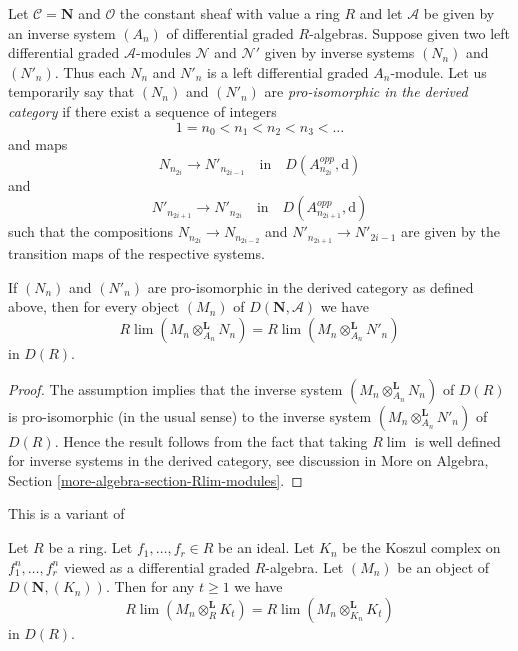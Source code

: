 \noindent
Let $\mathcal{C} = \mathbf{N}$ and $\mathcal{O}$ the constant sheaf
with value a ring $R$ and let $\mathcal{A}$ be given by an inverse
system $(A_n)$ of differential graded $R$-algebras. Suppose given two
left differential graded $\mathcal{A}$-modules $\mathcal{N}$ and
$\mathcal{N}'$ given by inverse systems $(N_n)$ and $(N'_n)$.
Thus each $N_n$ and $N'_n$ is a left differential graded $A_n$-module.
Let us temporarily say that $(N_n)$ and $(N'_n)$ are
{\it pro-isomorphic in the derived category}
if there exist a sequence of integers
$$
1 = n_0 < n_1 < n_2 < n_3 < \ldots
$$
and maps
$$
N_{n_{2i}} \to N'_{n_{2i - 1}}
\quad\text{in}\quad
D(A_{n_{2i}}^{opp}, \text{d})
$$
and
$$
N'_{n_{2i + 1}} \to N'_{n_{2i}}
\quad\text{in}\quad
D(A_{n_{2i + 1}}^{opp}, \text{d})
$$
such that the compositions $N_{n_{2i}} \to N_{n_{2i - 2}}$
and $N'_{n_{2i + 1}} \to N'_{2i - 1}$ are given by the transition
maps of the respective systems.

\begin{lemma}
\label{lemma-pro-isomorphic-systems-tensor}
If $(N_n)$ and $(N'_n)$ are pro-isomorphic in the derived category
as defined above,
then for every object $(M_n)$ of $D(\mathbf{N}, \mathcal{A})$ we have
$$
R\lim (M_n \otimes_{A_n}^\mathbf{L} N_n) =
R\lim (M_n \otimes_{A_n}^\mathbf{L} N'_n)
$$
in $D(R)$.
\end{lemma}

\begin{proof}
The assumption implies that the inverse system
$(M_n \otimes_{A_n}^\mathbf{L} N_n)$ of $D(R)$ is pro-isomorphic
(in the usual sense) to the inverse system
$(M_n \otimes_{A_n}^\mathbf{L} N'_n)$ of $D(R)$. Hence the
result follows from the fact that taking $R\lim$ is well
defined for inverse systems in the derived category, see
discussion in More on Algebra, Section \ref{more-algebra-section-Rlim-modules}.
\end{proof}

\begin{lemma}
\label{lemma-different-tensors}
\begin{reference}
This is a variant of \cite[Lemma 3.5.4]{BS}
\end{reference}
Let $R$ be a ring. Let $f_1, \ldots, f_r \in R$ be an ideal.
Let $K_n$ be the Koszul complex on $f_1^n, \ldots, f_r^n$
viewed as a differential graded $R$-algebra.
Let $(M_n)$ be an object of $D(\mathbf{N}, (K_n))$.
Then for any $t \geq 1$ we have
$$
R\lim (M_n \otimes_R^\mathbf{L} K_t) =
R\lim (M_n \otimes_{K_n}^\mathbf{L} K_t)
$$
in $D(R)$.
\end{lemma}

